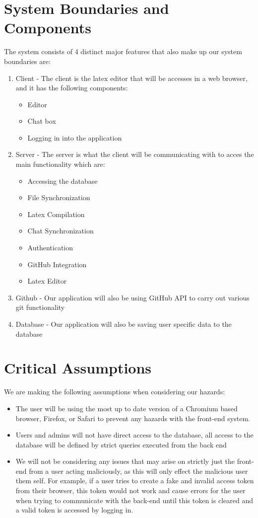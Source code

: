 \documentclass{article}
\begin{document}
	\section{System Boundaries and Components}
	The system consists of 4 distinct major features that also make up our system boundaries are:
	\begin{enumerate}
		\item Client - The client is the latex editor that will be accesses in a web browser, and it has the following components:
		\begin{itemize}
			\item Editor
			\item Chat box
			\item Logging in into the application
		\end{itemize}
		\item Server - The server is what the client will be communicating with to acces the main functionality which are:
		\begin{itemize}
			\item Accessing the database
			\item File Synchronization
			\item Latex Compilation
			\item Chat Synchronization
			\item Authentication
			\item GitHub Integration
			\item Latex Editor
		\end{itemize}
		\item Github - Our application will also be using GitHub API to carry out various git functionality
		\item Database - Our application will also be saving user specific data to the database
	\end{enumerate}
	
	\section{Critical Assumptions}
	
	We are making the following assumptions when considering our hazards:
	
	\begin{itemize}
		\item The user will be using the most up to date version of a Chromium based browser, Firefox, or Safari to prevent any hazards with the front-end system.
		\item Users and admins will not have direct access to the database, all access to the database will be defined by strict queries executed from the back end
		\item We will not be considering any issues that may arise on strictly just the front-end from a user acting maliciously, as this will only effect the malicious user them self. For example, if a user tries to create a fake and invalid access token from their browser, this token would not work and cause errors for the user when trying to communicate with the back-end until this token is cleared and a valid token is accessed by logging in.
	\end{itemize}
	
\end{document}
